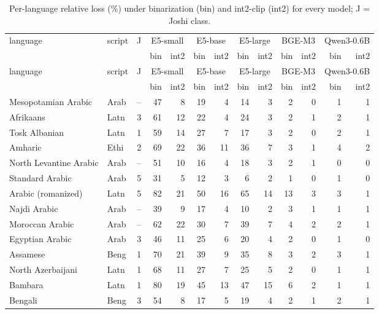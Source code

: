 \begin{small}
\begin{longtable}{llrrrrrrrrrrr}
\caption{Per-language relative loss (\%) under binarization (bin) and int2-clip (int2) for every model; J = Joshi class.}\label{tab:perlang}\\
\toprule
language & script & J & \multicolumn{2}{c}{E5-small} & \multicolumn{2}{c}{E5-base} & \multicolumn{2}{c}{E5-large} & \multicolumn{2}{c}{BGE-M3} & \multicolumn{2}{c}{Qwen3-0.6B} \\
 & & & bin & int2 & bin & int2 & bin & int2 & bin & int2 & bin & int2 \\
\midrule
\endfirsthead
\toprule
language & script & J & \multicolumn{2}{c}{E5-small} & \multicolumn{2}{c}{E5-base} & \multicolumn{2}{c}{E5-large} & \multicolumn{2}{c}{BGE-M3} & \multicolumn{2}{c}{Qwen3-0.6B} \\
 & & & bin & int2 & bin & int2 & bin & int2 & bin & int2 & bin & int2 \\
\midrule
\endhead
\bottomrule
\endfoot
Mesopotamian Arabic & Arab & -- & 47 & 8 & 19 & 4 & 14 & 3 & 2 & 0 & 1 & 1 \\
Afrikaans & Latn & 3 & 61 & 12 & 22 & 4 & 24 & 3 & 2 & 1 & 2 & 1 \\
Tosk Albanian & Latn & 1 & 59 & 14 & 27 & 7 & 17 & 3 & 2 & 0 & 2 & 1 \\
Amharic & Ethi & 2 & 69 & 22 & 36 & 11 & 36 & 7 & 3 & 1 & 4 & 2 \\
North Levantine Arabic & Arab & -- & 51 & 10 & 16 & 4 & 18 & 3 & 2 & 1 & 0 & 0 \\
Standard Arabic & Arab & 5 & 31 & 5 & 12 & 3 & 6 & 2 & 1 & 0 & 1 & 0 \\
Arabic (romanized) & Latn & 5 & 82 & 21 & 50 & 16 & 65 & 14 & 13 & 3 & 3 & 1 \\
Najdi Arabic & Arab & -- & 39 & 9 & 17 & 4 & 10 & 2 & 3 & 1 & 1 & 1 \\
Moroccan Arabic & Arab & -- & 62 & 22 & 30 & 7 & 39 & 7 & 4 & 2 & 2 & 1 \\
Egyptian Arabic & Arab & 3 & 46 & 11 & 25 & 6 & 20 & 4 & 2 & 0 & 1 & 0 \\
Assamese & Beng & 1 & 70 & 21 & 39 & 9 & 35 & 8 & 3 & 2 & 3 & 1 \\
North Azerbaijani & Latn & 1 & 68 & 11 & 27 & 7 & 25 & 5 & 2 & 0 & 1 & 1 \\
Bambara & Latn & 1 & 80 & 19 & 45 & 13 & 47 & 15 & 6 & 2 & 1 & 1 \\
Bengali & Beng & 3 & 54 & 8 & 17 & 5 & 19 & 4 & 2 & 1 & 2 & 1 \\

\end{longtable}
\end{small}
